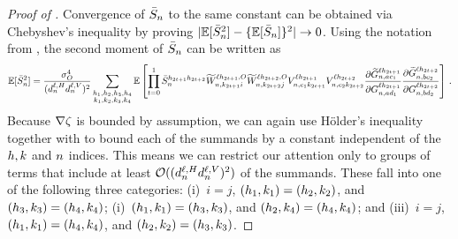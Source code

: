 \begin{proof}[Proof of ]
    Convergence of $\bar{S}_{n}$ to the same constant can be obtained via Chebyshev's inequality by proving $| \! \operatorname*{\mathbb{E}} [ \bar{S}_{n}^2] - \{ \operatorname*{\mathbb{E}} [ \bar{S}_{n}] \}^2  | \to 0$.
    Using the notation from ,
    the second moment of $\bar{S}_{n}$ can be written as
    \begin{align*}
        \operatorname*{\mathbb{E}} [\bar{S}_{n}^2]
        =
        \frac{\sigma_{O}^{4}}{(d_{n}^{\ell, H} d_{n}^{\ell, V})^2}
        \sum_{\substack{h_1, h_2, h_3, h_4 \\ k_1, k_2, k_3, k_4}}
            \operatorname*{\mathbb{E}} \left[
                \prod_{t=0}^1
                    \bar{S}_{n}^{h_{2t + 1} h_{2t + 2}}
                    \widetilde{W}_{n , k_{2t + 1} i}^{\ell h_{2t + 1} , O}
                    \widetilde{W}_{n , k_{2t + 2} j}^{\ell h_{2t + 2} , O}
                    V_{n, c_1 k_{2t + 1}}^{\ell h_{2t + 1}}
                    V_{n, c_2 k_{2t + 2}}^{\ell h_{2t + 2}}
                    \frac{
                        \partial
                        \widetilde{G}_{n, a c_1}^{\ell h_{2t + 1}}
                    }{
                        \partial 
                        G_{n, a d_1}^{\ell h_{2t + 1}}
                    }
                    \frac{
                        \partial
                        \widetilde{G}_{n, b c_2}^{\ell h_{2t + 2}}
                    }{
                        \partial 
                        G_{n, b d_2}^{\ell h_{2t + 2}}
                    }
            \right]
        \, .
    \end{align*}
    Because $\nabla \zeta$ is bounded by assumption, we can again use H{\" o}lder's inequality together with  to bound each of the summands by a constant independent of the $h, k$ and $n$ indices.
    This means we can restrict our attention only to groups of terms that include at least $\mathcal{O}((d_{n}^{\ell, H} d_{n}^{\ell, V})^2)$ of the summands. 
    These fall into one of the following three categories: (i)~$i = j$, $(h_1, k_1) = (h_2, k_2)$, and $(h_3, k_3) = (h_4, k_4)$; (i)~$(h_1, k_1) = (h_3, k_3)$, and $(h_2, k_4) = (h_4, k_4)$; and (iii)~$i = j$, $(h_1, k_1) = (h_4, k_4)$, and $(h_2, k_2) = (h_3, k_3)$.

\end{proof}
